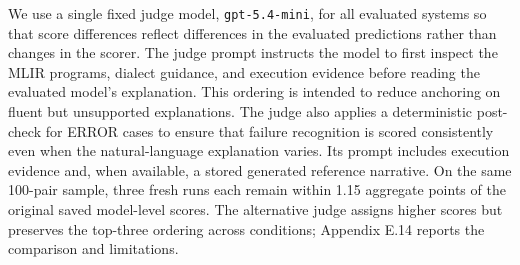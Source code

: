 \documentclass[sigplan,screen,review,anonymous]{acmart}
\providecommand{\DIFadd}[1]{{\protect\color{blue} \sf #1}} %
\providecommand{\DIFdel}[1]{{\protect\color{red} \scriptsize #1}} %
\providecommand{\DIFaddbegin}{} %
\providecommand{\DIFaddend}{} %
\providecommand{\DIFdelbegin}{} %
\providecommand{\DIFdelend}{} %
\begin{document}
We use a single fixed judge model, \texttt{gpt-5.4-mini}, for all evaluated systems\DIFdelbegin \DIFdel{so that score differences reflect differences in the evaluated predictions rather than changes in the scorer. The judge prompt instructs the model to first inspect the MLIR programs, dialect guidance, and execution evidence before reading the evaluated model's explanation. This ordering is intended to reduce anchoring on fluent but unsupported explanations. The judge also applies a deterministic post-check for \textsc{ERROR} cases to ensure that failure recognition is scored consistently even when the natural-language explanation varies}\DIFdelend . \DIFaddbegin \DIFadd{Its prompt includes execution evidence and, when available, a stored generated reference narrative. On the same 100-pair sample, three fresh runs each remain within 1.15 aggregate points of the original saved model-level scores. The alternative judge assigns higher scores but preserves the top-three ordering across conditions; Appendix E.14 reports the comparison and limitations.
}\DIFaddend 





\end{document}
